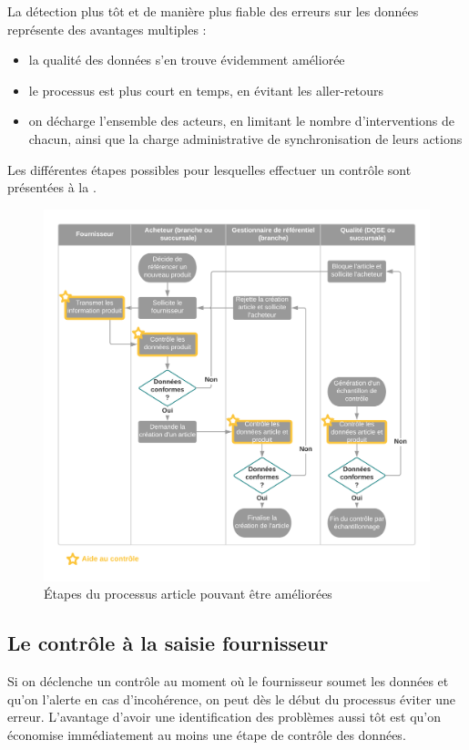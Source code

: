         La détection plus tôt et de manière plus fiable des erreurs sur les données représente des avantages multiples :
        \begin{itemize}
            \item la qualité des données s'en trouve évidemment améliorée
            \item le processus est plus court en temps, en évitant les aller-retours
            \item on décharge l'ensemble des acteurs, en limitant le nombre d'interventions de chacun, ainsi que la charge administrative de synchronisation de leurs actions             
        \end{itemize}
        Les différentes étapes possibles pour lesquelles effectuer un contrôle sont présentées à la .

        \begin{figure}[htbp]
            \begin{center}
            \includegraphics[width=0.9\linewidth]{img/Processus_de_creation_article_avec_aide_au_controle.png}
            \end{center}
            \caption{\'{E}tapes du processus article pouvant être améliorées}
            \label{fig:processus_article_aide_ctrle}
        \end{figure}    

            \subsection{Le contrôle à la saisie fournisseur}
            Si on déclenche un contrôle au moment où le fournisseur soumet les données et qu'on l'alerte en cas d'incohérence, on peut dès le début du processus éviter une erreur.
            L'avantage d'avoir une identification des problèmes aussi tôt est qu'on économise immédiatement au moins une étape de contrôle des données.

